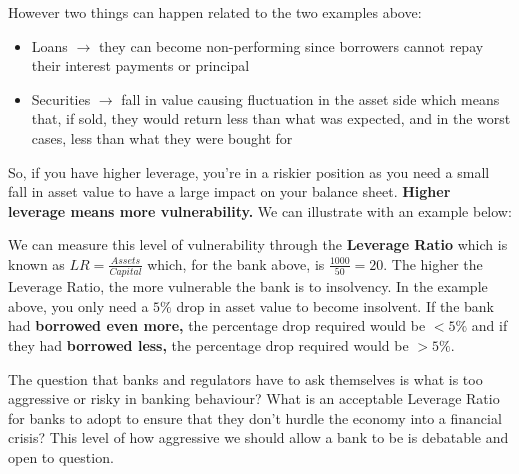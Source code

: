 \documentclass[12pt, letterpaper]{article}
\begin{document}
However two things can happen related to the two examples above:
\begin{itemize}
	\item Loans $\rightarrow$ they can become non-performing since borrowers cannot repay their interest payments or principal
	\item Securities $\rightarrow$ fall in value causing fluctuation in the asset side which means that, if sold, they would return less than what was expected, and in the worst cases, less than what they were bought for
\end{itemize}
So, if you have higher leverage, you're in a riskier position as you need a small fall in asset value to have a large impact on your balance sheet. \textbf{Higher leverage means more vulnerability.} We can illustrate with an example below:
\begin{center}
\noindent{}
\end{center}
We can measure this level of vulnerability through the \textbf{Leverage Ratio} which is known as $LR = \frac{Assets}{Capital}$ which, for the bank above, is $\frac{1000}{50} = 20$. The higher the Leverage Ratio, the more vulnerable the bank is to insolvency. In the example above, you only need a $5\%$ drop in asset value to become insolvent. If the bank had \textbf{borrowed even more,} the percentage drop required would be $<5\%$ and if they had \textbf{borrowed less,} the percentage drop required would be $>5\%$.

The question that banks and regulators have to ask themselves is what is too aggressive or risky in banking behaviour? What is an acceptable Leverage Ratio for banks to adopt to ensure that they don't hurdle the economy into a financial crisis? This level of how aggressive we should allow a bank to be is debatable and open to question.
\end{document}

